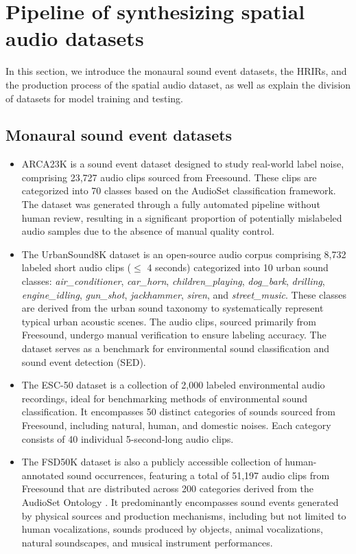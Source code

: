 \documentclass{IEEEtran}
\begin{document}
\section{Pipeline of synthesizing spatial audio datasets}   \label{sec:data}
In this section, we introduce the monaural sound event datasets, the HRIRs, and the production process of the spatial audio dataset, as well as explain the division of datasets for model training and testing.

\subsection{Monaural sound event datasets}
\label{sec: Sound Event Datasets}

\begin{itemize}
    \item ARCA23K \cite{gemmeke2017audio} is a sound event dataset designed to study real-world label noise, comprising 23,727 audio clips sourced from Freesound. These clips are categorized into 70 classes based on the AudioSet \cite{gemmeke2017audio} classification framework. The dataset was generated through a fully automated pipeline without human review, resulting in a significant proportion of potentially mislabeled audio samples due to the absence of manual quality control.
    \item The UrbanSound8K dataset \cite{salamon2014dataset} is an open-source audio corpus comprising 8,732 labeled short audio clips ($\leq$ 4 seconds) categorized into 10 urban sound classes: \emph{air\_conditioner}, \emph{car\_horn}, \emph{children\_playing}, \emph{dog\_bark}, \emph{drilling}, \emph{engine\_idling}, \emph{gun\_shot}, \emph{jackhammer}, \emph{siren}, and \emph{street\_music}. These classes are derived from the urban sound taxonomy to systematically represent typical urban acoustic scenes. The audio clips, sourced primarily from Freesound, undergo manual verification to ensure labeling accuracy. The dataset serves as a benchmark for environmental sound classification and sound event detection (SED).
    \item The ESC-50 dataset \cite{piczak2015esc} is a collection of 2,000 labeled environmental audio recordings, ideal for benchmarking methods of environmental sound classification. It encompasses 50 distinct categories of sounds sourced from Freesound, including natural, human, and domestic noises. Each category consists of 40 individual 5-second-long audio clips.
    \item The FSD50K dataset \cite{fonseca2021fsd50k} is also a publicly accessible collection of human-annotated sound occurrences, featuring a total of 51,197 audio clips from Freesound that are distributed across 200 categories derived from the AudioSet Ontology \cite{gemmeke2017audio}. It predominantly encompasses sound events generated by physical sources and production mechanisms, including but not limited to human vocalizations, sounds produced by objects, animal vocalizations, natural soundscapes, and musical instrument performances.
\end{itemize}
\end{document}
